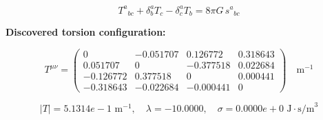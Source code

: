 
\begin{equation}
  T^a{}_{bc} + \delta^a_b T_c - \delta^a_c T_b = 8\pi G \, s^a{}_{bc}
\end{equation}

\textbf{Discovered torsion configuration:}

\begin{equation}
  T^{\mu\nu} = \begin{pmatrix}
    0 & -0.051707 & 0.126772 & 0.318643 \\
    0.051707 & 0 & -0.377518 & 0.022684 \\
    -0.126772 & 0.377518 & 0 & 0.000441 \\
    -0.318643 & -0.022684 & -0.000441 & 0
  \end{pmatrix} \quad \text{m}^{-1}
\end{equation}

\begin{equation}
  |T| = 5.1314e-1 \text{ m}^{-1}, \quad
  \lambda = -10.0000, \quad
  \sigma = 0.0000e+0 \text{ J}\cdot\text{s/m}^3
\end{equation}